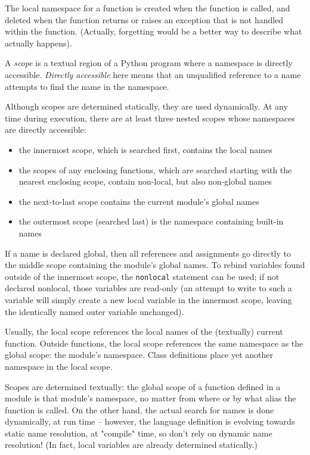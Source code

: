 The local namespace for a function is created when the function is called,
and deleted when the function returns
or raises an exception that is not handled within the function.
(Actually, forgetting would be a better way to describe what actually happens).

A \emph{scope} is a textual region of a Python program
where a namespace is directly accessible.
\emph{Directly accessible} here means that
an unqualified reference to a name attempts to find the name in the namespace.

Although scopes are determined statically, they are used dynamically.
At any time during execution,
there are at least three nested scopes
whose namespaces are directly accessible:

\begin{itemize}
\item the innermost scope, which is searched first, contains the local names
\item the scopes of any enclosing functions,
which are searched starting with the nearest enclosing scope,
contain non-local, but also non-global names
\item the next-to-last scope contains the current module's global names
\item the outermost scope (searched last)
is the namespace containing built-in names
\end{itemize}

If a name is declared global, then all references and assignments
go directly to the middle scope containing the module's global names.
To rebind variables found outside of the innermost scope,
the \verb=nonlocal= statement can be used;
if not declared nonlocal, those variables are read-only
(an attempt to write to such a variable
will simply create a new local variable in the innermost scope,
leaving the identically named outer variable unchanged).

Usually, the local scope references the local names
of the (textually) current function.
Outside functions, the local scope
references the same namespace as the global scope: the module's namespace.
Class definitions place yet another namespace in the local scope.

Scopes are determined textually:
the global scope of a function defined in a module is that module's namespace,
no matter from where or by what alias the function is called.
On the other hand, the actual search for names is done dynamically,
at run time – however, the language definition is evolving
towards static name resolution, at "compile" time,
so don't rely on dynamic name resolution!
(In fact, local variables are already determined statically.)


